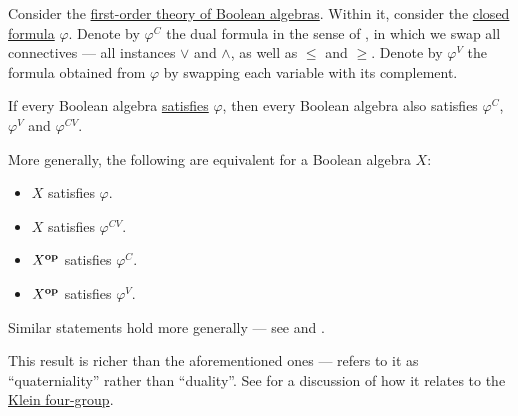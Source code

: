 \begin{theorem}\label{thm:boolean_algebra_duality}
  Consider the \hyperref[def:lattice/theory]{first-order theory of Boolean algebras}. Within it, consider the \hyperref[def:first_order_syntax/closed_formula]{closed formula} \( \varphi \). Denote by \( \varphi^C \) the dual formula in the sense of , in which we swap all connectives --- all instances \( \vee \) and \( \wedge \), as well as \( \leq \) and \( \geq \). Denote by \( \varphi^V \) the formula obtained from \( \varphi \) by swapping each variable with its complement.

  If every Boolean algebra \hyperref[def:first_order_model]{satisfies} \( \varphi \), then every Boolean algebra also satisfies \( \varphi^C \), \( \varphi^V \) and \( \varphi^{CV} \).

  More generally, the following are equivalent for a Boolean algebra \( X \):
  \begin{paracol}{2}
    \begin{leftcolumn}
      \begin{itemize}
        \item \( X \) satisfies \( \varphi \).
        \item \( X \) satisfies \( \varphi^{CV} \).
      \end{itemize}
    \end{leftcolumn}

    \begin{rightcolumn}
      \begin{itemize}
        \item \( X^\oppos \) satisfies \( \varphi^C \).
        \item \( X^\oppos \) satisfies \( \varphi^V \).
      \end{itemize}
    \end{rightcolumn}
  \end{paracol}
\end{theorem}
\begin{comments}
  \item Similar statements hold more generally --- see  and .

  \item This result is richer than the aforementioned ones ---  refers to it as \enquote{quaterniality} rather than \enquote{duality}. See  for a discussion of how it relates to the \hyperref[def:klein_four_group]{Klein four-group}.
\end{comments}
